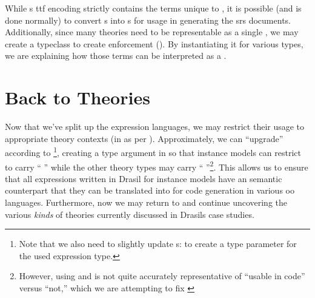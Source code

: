 While \ModelExpr{}s \acs{ttf} encoding strictly contains the terms unique to
\ModelExpr{}, it is possible (and is done normally) to convert \Expr{}s into
\ModelExpr{}s for usage in generating the \acs{srs} documents. Additionally,
since many theories need to be representable as a single \Relation{}, we may
create a typeclass to create enforcement (). By
instantiating it for various types, we are explaining how those terms can be
interpreted as a \ModelExpr{}.

\currentExpressHaskell{}
 
\section{Back to Theories}
\label{chap:lang-division:sec:back-to-theories}

Now that we've split up the expression languages, we may restrict their usage to
appropriate theory contexts (in \ModelKinds{} as per ).
Approximately, we can ``upgrade'' \ModelKinds according to
 \footnote{Note that we also need to
slightly update \QDefinition{}s:  to create a
type parameter for the used expression type.}, creating a type argument in
\ModelKinds{} so that instance models can restrict to carry ``\ModelKinds{}
\Expr{}'' while the other theory types may carry ``\ModelKinds{}
\ModelExpr{}''\footnote{However, using \Expr{} and \ModelExpr{} is not quite
accurately representative of ``usable in code'' versus ``not,'' which we are
attempting to fix \cite{DrasilIssue2853AlternativeModelKinds}}. This allows us
to ensure that all expressions written in Drasil for instance models have an
semantic counterpart that they can be translated into for code generation in
various \acs{oo} languages. Furthermore, now we may return to \ModelKinds{} and
continue uncovering the various \textit{kinds} of theories currently discussed
in Drasils case studies.

\pseudoPartialModelKindsUpgrade{}
